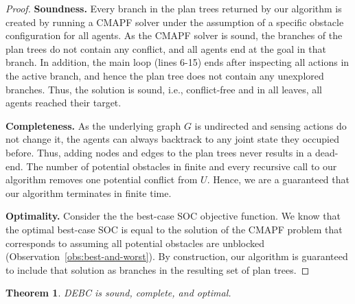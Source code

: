 \documentclass[letterpaper]{article} %
\newtheorem{theorem}{Theorem}
\begin{document}
\begin{proof}
\noindent \textbf{Soundness.}
Every branch in the plan trees returned by our algorithm is created by running a CMAPF solver under the assumption of a specific obstacle configuration for all agents. 
As the CMAPF solver is sound, the branches of the plan trees do not contain any conflict, and all agents end at the goal in that branch. In addition, the main loop (lines 6-15) ends after inspecting all actions in the active branch, and hence the plan tree does not contain any unexplored branches. 
Thus, the solution is sound, i.e., conflict-free and in all leaves, all agents reached their target.

\noindent\textbf{Completeness.} 
As the underlying graph $G$ is undirected and sensing actions do not change it, the agents can always backtrack to any joint state they occupied before. Thus, adding nodes and edges to the plan trees never results in a dead-end. 
The number of potential obstacles in finite and every recursive call to our algorithm removes one potential conflict from $U$. Hence, we are a guaranteed that our algorithm terminates in finite time. 

\noindent\textbf{Optimality.} Consider the the best-case SOC objective function. We know that the optimal best-case SOC is equal to the solution of the CMAPF problem that corresponds to assuming all potential obstacles are unblocked (Observation~\ref{obs:best-and-worst}). By construction, our algorithm is guaranteed to include that solution as branches in the resulting set of plan trees. 
\end{proof}



\begin{theorem}
DEBC is sound, complete, and optimal. 
\label{the:debc-optimal}
\end{theorem}
\end{document}
